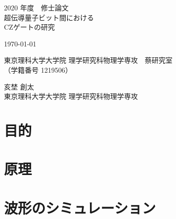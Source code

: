 \documentclass[uplatex,openany,oneside,a4j,11pt]{jsbook}
\begin{document}
\begin{titlepage}
    \begin{center}
        {\Large 2020 年度　修士論文}\\
        \vspace{180truept}
        {\Huge 超伝導量子ビット間における\\
        \vspace{10truept}
        CZゲートの研究}\\
        \vspace{70truept}

        {\Large \today}\\

        \vspace{70truept}

        {\Large 東京理科大学大学院 理学研究科物理学専攻　蔡研究室\\
        （学籍番号 1219506）}\\

        \vspace{20truept}

        {\huge 亥埜 創太}\\

        \vspace{160truept}
        {\Large 東京理科大学大学院 理学研究科物理学専攻}\\
    \end{center}
\end{titlepage}


\setcounter{tocdepth}{2}
\tableofcontents
\chapter{目的}
    \begin{abstract}
    \end{abstract}
    

\chapter{原理}
    \begin{abstract}
    \end{abstract}
    

\chapter{波形のシミュレーション}
    \begin{abstract}
    \end{abstract}
    
\end{document}
